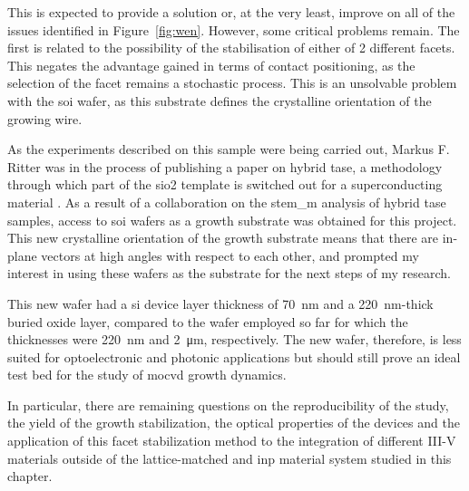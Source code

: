This is expected to provide a solution or, at the very least, improve on all of the issues identified in Figure~\ref{fig:wen}. However, some critical problems remain. The first is related to the possibility of the stabilisation of either of 2 different  facets. This negates the advantage gained in terms of contact positioning, as the selection of the  facet remains a stochastic process. This is an unsolvable problem with the \hkl[0 0 1] \acs{soi} wafer, as this substrate defines the crystalline orientation of the growing wire. 

As the experiments described on this sample were being carried out, Markus F. Ritter was in the process of publishing a paper on hybrid \acs{tase}, a methodology through which part of the \acs{sio2} template is switched out for a superconducting material \cite{Ritter2021}. As a result of a collaboration on the \acs{stem_m} analysis of hybrid \acs{tase} samples, access to \hkl[1 1 0] \acs{soi} wafers as a growth substrate was obtained for this project. This new crystalline orientation of the growth substrate means that there are in-plane  vectors at high angles with respect to each other, and prompted my interest in using these wafers as the substrate for the next steps of my research.

This new wafer had a \acl{si} device layer thickness of \qty{70}{\nano\metre} and a \qty{220}{\nano\metre}-thick buried oxide layer, compared to the \hkl[0 0 1] wafer employed so far for which the thicknesses were \qty{220}{\nano\metre} and \qty{2}{\micro\metre}, respectively. The new wafer, therefore, is less suited for optoelectronic and photonic applications but should still prove an ideal test bed for the study of \acs{mocvd} growth dynamics.

In particular, there are remaining questions on the reproducibility of the study, the yield of the growth stabilization, the optical properties of the devices and the application of this facet stabilization method to the integration of different III-V materials outside of the lattice-matched  and \acs{inp} material system \cite{Pearsall1980, Sugii1983, Wagner1970} studied in this chapter.
